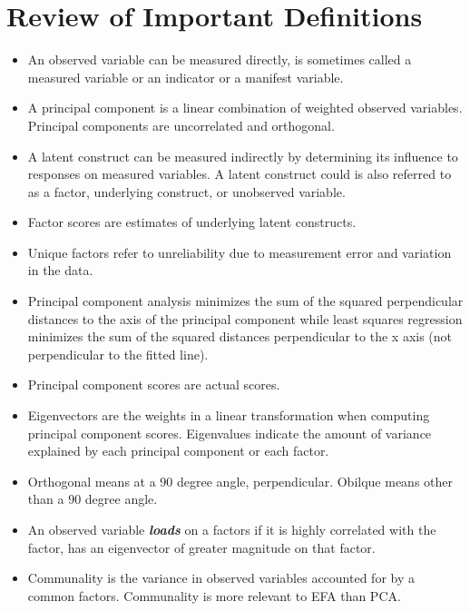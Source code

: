 \documentclass[a4paper,12pt]{article}
\begin{document}
	\tableofcontents

\section{Review of Important Definitions}
\begin{itemize}
\item An observed variable can be measured directly, is sometimes called a measured variable or an indicator or a
manifest variable.
\item A principal component is a linear combination of weighted observed variables. Principal components are
uncorrelated and orthogonal.
\item A latent construct can be measured indirectly by determining its influence to responses on measured variables. A latent construct could is also referred to as a factor, underlying construct, or unobserved variable.
\item Factor scores are estimates of underlying latent constructs.
\item Unique factors refer to unreliability due to measurement error and variation in the data.
\item Principal component analysis minimizes the sum of the squared perpendicular distances to the axis of the
principal component while least squares regression minimizes the sum of the squared distances perpendicular to the
x axis (not perpendicular to the fitted line).
\item Principal component scores are actual scores.
\item Eigenvectors are the weights in a linear transformation when computing principal component scores.
Eigenvalues indicate the amount of variance explained by each principal component or each factor.
\item Orthogonal means at a 90 degree angle, perpendicular.
Obilque means other than a 90 degree angle.
\item An observed variable \textbf{\emph{loads}} on a factors if it is highly correlated with the factor, has an eigenvector of greater magnitude on that factor.
\item Communality is the variance in observed variables accounted for by a common factors. Communality is more
relevant to EFA than PCA.
\end{itemize}
\end{document}
